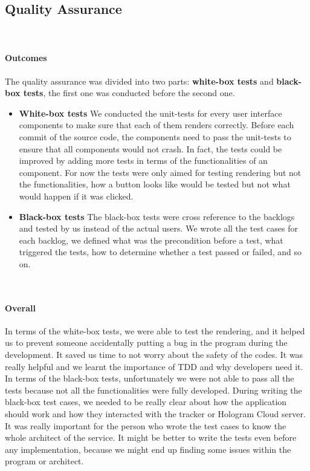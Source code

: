 \documentclass[12pt,a4paper]{article}
\begin{document}
      \subsection{Quality Assurance}
        \paragraph{Outcomes} The quality assurance was divided into two parts: {\bf white-box tests} and {\bf black-box tests}, the first one was conducted before the second one.
        \begin{itemize}
          \item {\bf White-box tests} We conducted the unit-tests for every user interface components to make sure that each of them renders correctly. Before each commit of the source code, the components need to pass the unit-tests to ensure that all components would not crash. In fact, the tests could be improved by adding more tests in terms of the functionalities of an component. For now the tests were only aimed for testing rendering but not the functionalities, how a button looks like would be tested but not what would happen if it was clicked. 
          \item {\bf Black-box tests} The black-box tests were cross reference to the backlogs and tested by us instead of the actual users. We wrote all the test cases for each backlog, we defined what was the precondition before a test, what triggered the tests, how to determine whether a test passed or failed, and so on.  
        \end{itemize}

        \paragraph{Overall} In terms of the white-box tests, we were able to test the rendering, and it helped us to prevent someone accidentally putting a bug in the program during the development. It saved us time to not worry about the safety of the codes. It was really helpful and we learnt the importance of TDD and why developers need it. In terms of the black-box tests, unfortunately we were not able to pass all the tests because not all the functionalities were fully developed. During writing the black-box test cases, we needed to be really clear about how the application should work and how they interacted with the tracker or Hologram Cloud server. It was really important for the person who wrote the test cases to know the whole architect of the service. It might be better to write the tests even before any implementation, because we might end up finding some issues within the program or architect.
\end{document}
